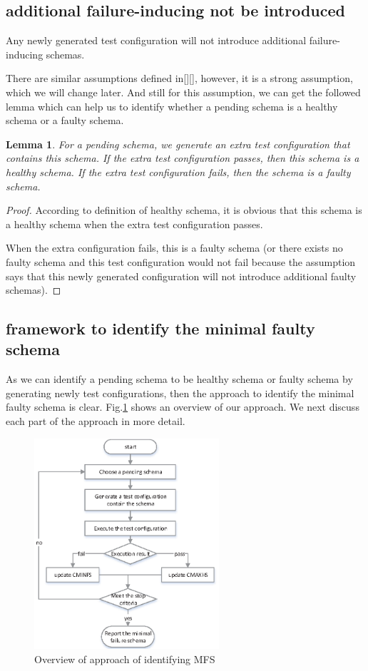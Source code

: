 \documentclass[10pt,journal,cspaper,compsoc]{IEEEtran}
\begin{document}
\subsection{additional failure-inducing not be introduced}
\begin{assumption}
Any newly generated test configuration will not introduce additional failure-inducing schemas.
\end{assumption}

There are similar assumptions defined in[][], however, it is a strong assumption, which we will change later. And still for this assumption, we can get the followed lemma which can help us to identify whether a pending schema is a healthy schema or a faulty schema.
\newtheorem{lemma}{Lemma}
\begin{lemma}
For a pending schema, we generate an extra test configuration that contains this schema. If the extra test configuration passes, then this schema is a healthy schema. If the extra test configuration fails, then the schema is a faulty schema.
\end{lemma}
\begin{proof}
According to definition of healthy schema, it is obvious that this schema is a healthy schema when the extra test configuration passes.

When the extra configuration fails, this is a faulty schema (or there exists no faulty schema and this test configuration would not fail because the assumption says that this newly generated configuration will not introduce additional faulty schemas).
\end{proof}

\subsection{framework to identify the minimal faulty schema}
As we can identify a pending schema to be healthy schema or faulty schema by generating newly test configurations, then the approach to identify the minimal faulty schema is clear. Fig.\ref{fig_overview} shows an overview of our approach. We next discuss each part of the approach in more detail.
\begin{figure}
 \centering
 \includegraphics[width=2.7in]{gp.eps}
 \caption{Overview of approach of identifying MFS}
 \label{fig_overview}
\end{figure}
\end{document}
